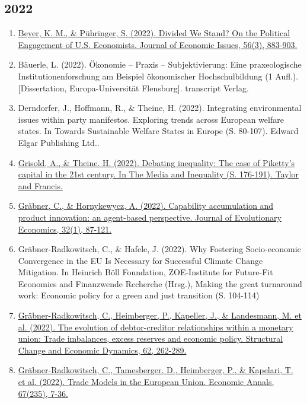 \subsection*{2022}
\begin{enumerate}
	 \item \href{https://doi.org/10.1080/00213624.2022.2093581}{Beyer, K. M., \& Pühringer, S. (2022). Divided We Stand? On the Political Engagement of U.S. Economists. Journal of Economic Issues, 56(3), 883-903.}
	 \item Bäuerle, L. (2022). Ökonomie – Praxis – Subjektivierung: Eine praxeologische Institutionenforschung am Beispiel ökonomischer Hochschulbildung (1 Aufl.). [Dissertation, Europa-Universität Flensburg]. transcript Verlag.
	 \item Derndorfer, J., Hoffmann, R., \& Theine, H. (2022). Integrating environmental issues within party manifestos. Exploring trends across European welfare states. In Towards Sustainable Welfare States in Europe (S. 80-107). Edward Elgar Publishing Ltd..
	 \item \href{https://doi.org/10.4324/9781003104476-16}{Grisold, A., \& Theine, H. (2022). Debating inequality: The case of Piketty's capital in the 21st century. In The Media and Inequality (S. 176-191). Taylor and Francis.}
	 \item \href{https://doi.org/10.1007/s00191-021-00732-9}{Gräbner, C., \& Hornykewycz, A. (2022). Capability accumulation and product innovation: an agent-based perspective. Journal of Evolutionary Economics, 32(1), 87-121.}
	 \item Gräbner-Radkowitsch, C., \& Hafele, J. (2022). Why Fostering Socio-economic Convergence in the EU Is Necessary for Successful Climate Change Mitigation. In Heinrich Böll Foundation, ZOE-Institute for Future-Fit Economies and Finanzwende Recherche (Hrsg.), Making the great turnaround work: Economic policy for a green and just transition (S. 104-114)
	 \item \href{https://doi.org/10.1016/j.strueco.2022.05.004}{Gräbner-Radkowitsch, C., Heimberger, P., Kapeller, J., \& Landesmann, M. et al. (2022). The evolution of debtor-creditor relationships within a monetary union: Trade imbalances, excess reserves and economic policy. Structural Change and Economic Dynamics, 62, 262-289.}
	 \item \href{https://doi.org/10.2298/EKA2235007G}{Gräbner-Radkowitsch, C., Tamesberger, D., Heimberger, P., \& Kapelari, T. et al. (2022). Trade Models in the European Union. Economic Annals, 67(235), 7-36.}

\end{enumerate}
